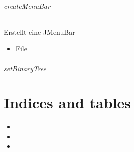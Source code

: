 \documentclass[letterpaper,10pt,ngerman]{sphinxmanual}
\begin{document}
\subparagraph{createMenuBar}
\label{\detokenize{com/linuxluigi/edu/view/View:createmenubar}}

\begin{fulllineitems}
\label{\detokenize{com/linuxluigi/edu/view/View:com.linuxluigi.edu.view.View.createMenuBar()}}
Erstellt eine JMenuBar
\begin{itemize}
\item {} 
File

\end{itemize}

\end{fulllineitems}



\subparagraph{setBinaryTree}
\label{\detokenize{com/linuxluigi/edu/view/View:setbinarytree}}

\begin{fulllineitems}
\label{\detokenize{com/linuxluigi/edu/view/View:com.linuxluigi.edu.view.View.setBinaryTree(Listlabel)}}
\end{fulllineitems}



\chapter{Indices and tables}
\label{\detokenize{index:indices-and-tables}}\begin{itemize}
\item {} 

\item {} 

\item {} 

\end{itemize}



\renewcommand{\indexname}{Stichwortverzeichnis}
\printindex
\end{document}
